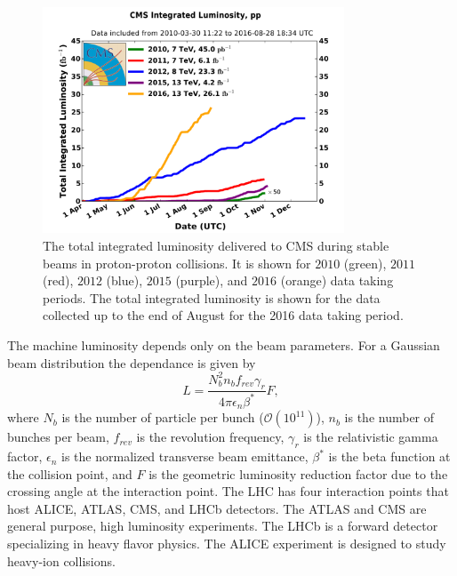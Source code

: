 \begin{figure}[h]
\centering
\includegraphics[width=0.8\textwidth]{figures_chapter2/int_lumi_cumulative_pp_2}
\caption{The total integrated luminosity delivered to CMS during stable beams in proton-proton collisions\cite{lumi_plot}. It is shown for $2010$ (green), $2011$ (red), $2012$ (blue), $2015$ (purple), and $2016$ (orange) data taking periods. The total integrated luminosity is shown for the data collected up to the end of August for the 2016 data taking period.} 
\label{fig:int}
\end{figure}

The machine luminosity depends only on the beam parameters. For a Gaussian beam distribution the dependance is given by
\begin{equation} \label{eq:lumi_beam}
L = \frac{N_{b}^2n_bf_{rev}\gamma_{r}}{4\pi\epsilon_n\beta^{*}}F,
\end{equation}
where $N_b$ is the number of particle per bunch ($\mathcal{O}(10^{11})$), $n_b$ is the number of bunches per beam, $f_{rev}$ is the revolution frequency, $\gamma_r$ is the relativistic gamma factor, $\epsilon_n$ is the normalized transverse beam emittance, $\beta^{*}$ is the beta function at the collision point, and $F$ is the geometric luminosity reduction factor due to the crossing angle at the interaction point.  The LHC has four interaction points that host ALICE\cite{Aamodt:2008zz}, ATLAS\cite{Aad:2008zzm}, CMS\cite{Chatrchyan:2008aa}, and LHCb\cite{Alves:2008zz} detectors. The ATLAS and CMS are general purpose, high luminosity experiments. The LHCb is a forward detector specializing in heavy flavor physics. The ALICE experiment is designed to study heavy-ion collisions.   


